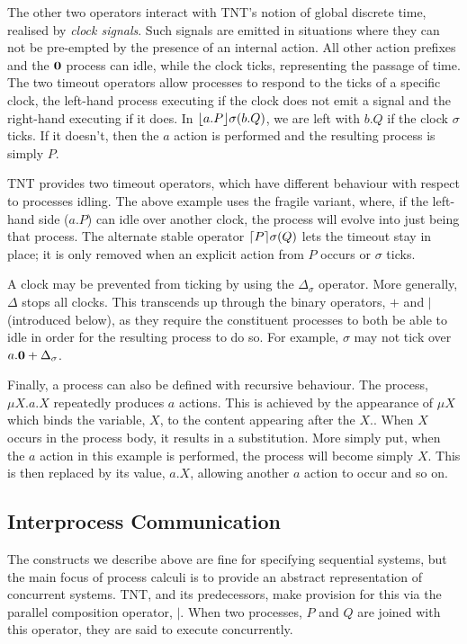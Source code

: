 \documentclass{acm_proc_article-sp}
\begin{document}
The other two operators interact with TNT's notion of global discrete
time, realised by \emph{clock signals}.  Such signals are emitted in
situations where they can not be pre-empted by the presence of an
internal action.  All other action prefixes and the $\textbf{0}$ process can
idle, while the clock ticks, representing the passage of time.  The two
timeout operators allow processes to respond to the ticks of a specific
clock, the left-hand process executing if the clock does not emit a
signal and the right-hand executing if it does.  In
$\lfloor{a.P}\rfloor {\sigma} ({b.Q})$, we are left with $b.Q$ if the clock
$\sigma$ ticks.  If it doesn't, then the $a$ action is performed and the
resulting process is simply $P$.

TNT provides two timeout operators, which have different behaviour with
respect to processes idling.  The above example uses the fragile
variant, where, if the left-hand side ($a.P$) can idle over another
clock, the process will evolve into just being that process.  The
alternate stable operator $\lceil{P}\rceil {\sigma} ({Q})$ lets the timeout
stay in place; it is only removed when an explicit action from $P$
occurs or $\sigma$ ticks.

A clock may be prevented from ticking by using the $\Delta_\sigma$
operator.  More generally, $\Delta$ stops all clocks.  This transcends
up through the binary operators, $+$ and $\mid$ (introduced below), as
they require the constituent processes to both be able to idle in order
for the resulting process to do so.  For example, $\sigma$ may not tick
over $a.\textbf{0} + \Delta_\sigma$.

Finally, a process can also be defined with recursive behaviour.  The
process, $\mu X.a.X$ repeatedly produces $a$ actions.  This is achieved
by the appearance of $\mu X$ which binds the variable, $X$, to the
content appearing after the $X.$.  When $X$ occurs in the process body,
it results in a substitution.  More simply put, when the $a$ action in
this example is performed, the process will become simply $X$.  This is
then replaced by its value, $a.X$, allowing another $a$ action to occur
and so on.

\subsection{Interprocess Communication}
\label{ipc}

The constructs we describe above are fine for specifying sequential
systems, but the main focus of process calculi is to provide an abstract
representation of concurrent systems.  TNT, and its predecessors, make
provision for this via the parallel composition operator, $\mid$.  When
two processes, $P$ and $Q$ are joined with this operator, they are said
to execute concurrently.  
\end{document}
